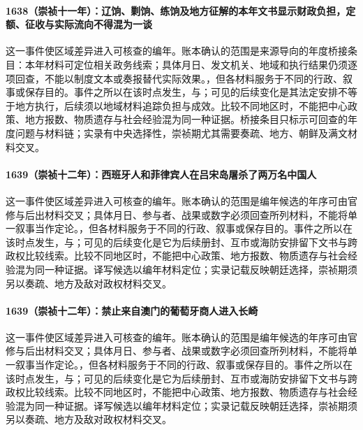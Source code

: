 \paragraph{1638（崇祯十一年）：辽饷、剿饷、练饷及地方征解的本年文书显示财政负担，定额、征收与实际流向不得混为一谈} 这一事件使区域差异进入可核查的编年。账本确认的范围是来源导向的年度桥接条目：本年材料可定位相关政务线索；具体月日、发文机关、地域和执行结果仍须逐项回查，不能以制度文本或奏报替代实际效果。，但各材料服务于不同的行政、叙事或保存目的。事件之所以在该时点发生，与；可见的后续变化是其法定安排不等于地方执行，后续须以地域材料追踪负担与成效。比较不同地区时，不能把中心政策、地方报数、物质遗存与社会经验混为同一种证据。桥接条目只标示可回查的年度问题与材料链；实录有中央选择性，崇祯期尤其需要奏疏、地方、朝鲜及满文材料交叉。

\paragraph{1639（崇祯十二年）：西班牙人和菲律宾人在吕宋岛屠杀了两万名中国人} 这一事件使区域差异进入可核查的编年。账本确认的范围是编年候选的年序可由官修与后出材料交叉；具体月日、参与者、战果或数字必须回查所列材料，不能将单一叙事当作定论。，但各材料服务于不同的行政、叙事或保存目的。事件之所以在该时点发生，与；可见的后续变化是它为后续册封、互市或海防安排留下文书与跨政权比较线索。比较不同地区时，不能把中心政策、地方报数、物质遗存与社会经验混为同一种证据。译写候选以编年材料定位；实录记载反映朝廷选择，崇祯期须另以奏疏、地方及敌对政权材料交叉。

\paragraph{1639（崇祯十二年）：禁止来自澳门的葡萄牙商人进入长崎} 这一事件使区域差异进入可核查的编年。账本确认的范围是编年候选的年序可由官修与后出材料交叉；具体月日、参与者、战果或数字必须回查所列材料，不能将单一叙事当作定论。，但各材料服务于不同的行政、叙事或保存目的。事件之所以在该时点发生，与；可见的后续变化是它为后续册封、互市或海防安排留下文书与跨政权比较线索。比较不同地区时，不能把中心政策、地方报数、物质遗存与社会经验混为同一种证据。译写候选以编年材料定位；实录记载反映朝廷选择，崇祯期须另以奏疏、地方及敌对政权材料交叉。
